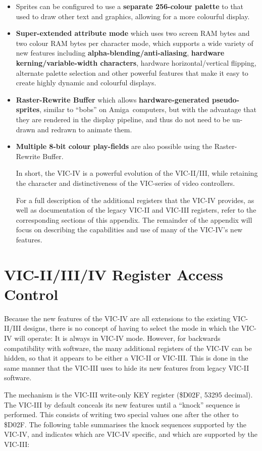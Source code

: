 \begin{itemize}
  \item Sprites can be configured to use a {\bf separate 256-colour palette} to that used to draw other text and graphics, allowing for a more colourful display.
  \item {\bf Super-extended attribute mode} which uses two screen RAM bytes and two colour RAM bytes per character mode, which supports a wide variety of new features including {\bf alpha-blending/anti-aliasing}, {\bf hardware kerning/variable-width characters}, hardware horizontal/vertical flipping, alternate palette selection and other powerful features that make it easy to create highly dynamic and colourful displays.
  \item {\bf Raster-Rewrite Buffer} which allows {\bf hardware-generated pseudo-sprites}, similar to ``bobs'' on Amiga\texttrademark \ computers, but with the advantage that they are rendered in the display pipeline, and thus do not need to be un-drawn and redrawn to animate them.
    \item {\bf Multiple 8-bit colour play-fields} are also possible using the Raster-Rewrite Buffer.

      In short, the VIC-IV is a powerful evolution of the VIC-II/III, while retaining the character and distinctiveness of the VIC-series of
      video controllers.

      For a full description of the additional registers that the VIC-IV provides, as well as documentation of the legacy VIC-II and VIC-III registers, refer to the corresponding sections of this appendix. The remainder of the appendix will focus on describing the capabilities and use of many of the VIC-IV's new features.
\end{itemize}

\section{VIC-II/III/IV Register Access Control}
Because the new features of the VIC-IV are all extensions to the existing VIC-II/III designs, there is no concept of having to select the mode in which the VIC-IV will operate: It is always in VIC-IV mode. However, for backwards compatibility with software, the many additional registers of the VIC-IV can be hidden, so that it appears to be either a VIC-II or VIC-III. This is done in the same manner that the VIC-III uses to hide its new features from legacy VIC-II software.

 The mechanism is the VIC-III write-only KEY register (\$D02F, 53295 decimal).  The VIC-III by default conceals its new features until a ``knock'' sequence is performed.  This consists of writing two special values one after the other to \$D02F.  The following table summarises the knock sequences supported by the VIC-IV, and indicates which are VIC-IV specific, and which are supported by the VIC-III:

